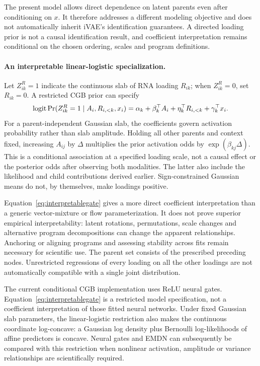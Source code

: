 The present model allows direct dependence on latent parents even after
conditioning on \(x\). It therefore addresses a different modeling
objective and does not automatically inherit iVAE's identification
guarantees. A directed loading prior is not a causal identification
result, and coefficient interpretation remains conditional on the chosen
ordering, scales and program definitions.

\paragraph{An interpretable linear-logistic specialization.}
Let \(Z^R_{ik}=1\) indicate the continuous slab of RNA loading \(R_{ik}\);
when \(Z^R_{ik}=0\), set \(R_{ik}=0\). A restricted CGB prior can specify
\begin{equation}\label{eq:interpretablegate}
\operatorname{logit}\Pr(Z^R_{ik}=1\mid A_i,R_{i,<k},x_i)
=\alpha_k+\beta_k^\top A_i
             +\eta_k^\top R_{i,<k}+\gamma_k^\top x_i .
\end{equation}
For a parent-independent Gaussian slab, the coefficients govern activation
probability rather than slab amplitude. Holding all other parents and
context fixed, increasing \(A_{ij}\) by \(\Delta\) multiplies the prior
activation odds by \(\exp(\beta_{kj}\Delta)\).
This is a conditional association at a specified loading scale, not a
causal effect or the posterior odds after observing both modalities.
The latter also include the likelihood and child contributions derived
earlier. Sign-constrained Gaussian means do not, by themselves, make
loadings positive.

Equation~\eqref{eq:interpretablegate} gives a more direct coefficient
interpretation than a generic vector-mixture or flow parameterization.
It does not prove superior empirical interpretability: latent rotations,
permutations, scale changes and alternative program decompositions can
change the apparent relationships. Anchoring or aligning programs and
assessing stability across fits remain necessary for scientific use.
The parent set consists of the prescribed preceding nodes. Unrestricted
regressions of every loading on all the other loadings are not
automatically compatible with a single joint distribution.

The current conditional CGB implementation uses ReLU neural gates.
Equation~\eqref{eq:interpretablegate} is a restricted model specification,
not a coefficient interpretation of those fitted neural networks.
Under fixed Gaussian slab parameters, the linear-logistic
restriction also makes the continuous coordinate log-concave: a Gaussian
log density plus Bernoulli log-likelihoods of affine predictors is concave. Neural gates and EMDN can subsequently
be compared with this restriction when nonlinear activation, amplitude or
variance relationships are scientifically required.

